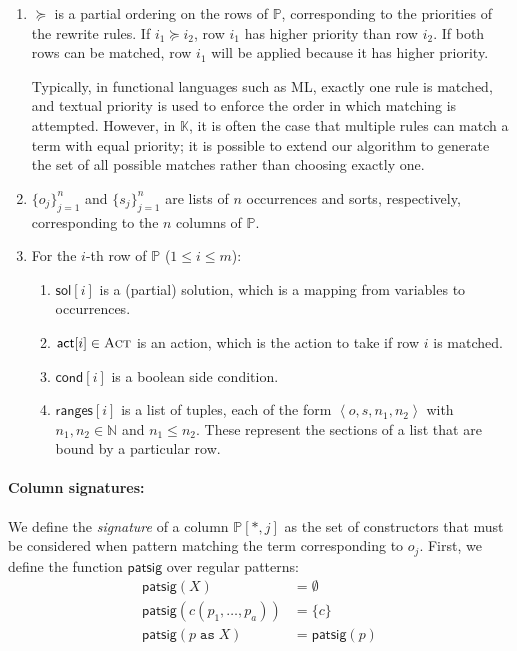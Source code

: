 \documentclass{article}
\theoremstyle{definition}
\newcommand{\K}{$\mathbb{K}$\xspace}
\newcommand{\NN}{\mathbb{N}}
\newcommand{\Act}{\textsc{Act}}
\newcommand{\pr}[1]{\left\langle #1 \right\rangle}
\newcommand{\sol}{\mathsf{sol}}
\newcommand{\actb}{\mathsf{act}}
\newcommand{\condb}{\mathsf{cond}}
\newcommand{\lslen}{\mathsf{ranges}}
\newcommand{\PP}{\mathbb{P}}
\newcommand{\ppcol}[1]{\PP[*,#1]}
\newcommand{\patsig}{\mathsf{patsig}}
\begin{document}
\begin{enumerate}

  \item $\succeq$ is a partial ordering on the rows of $\PP$, corresponding to
    the priorities of the rewrite rules. If $i_1 \succeq i_2$, row $i_1$ has
    higher priority than row $i_2$.  If both rows can be matched, row $i_1$ will
    be applied because it has higher priority. 

    Typically, in functional languages such as ML, exactly one rule is matched,
    and textual priority is used to enforce the order in which matching is
    attempted. However, in \K, it is often the case that multiple rules can
    match a term with equal priority; it is possible to extend our algorithm to
    generate the set of all possible matches rather than choosing exactly one.

  \item $ \{ o_j \}^n_{j=1} $ and $ \{ s_j \}^n_{j=1} $ are lists of $n$
    occurrences and sorts, respectively, corresponding to the $n$ columns of
    $\PP$.

  \item For the $i$-th row of $\PP$ ($1 \le i \le m$):
  \begin{enumerate}
    \item $\sol[i]$ is a (partial) solution, which is a mapping from
      variables to occurrences.

    \item $\actb[i] \in \Act$ is an action, which is the action to take if row
      $i$ is matched.

    \item $\condb[i]$ is a boolean side condition.

    \item $\lslen[i]$ is a list of tuples, each of the form $ \pr{o, s, n_1,
      n_2} $ with $ n_1, n_2 \in \NN $ and $ n_1 \leq n_2 $. These represent the
      sections of a list that are bound by a particular row.
  \end{enumerate}
\end{enumerate}

\paragraph{Column signatures:}

We define the \emph{signature} of a column $ \ppcol{j} $ as the set of
constructors that must be considered when pattern matching the term
corresponding to $ o_j $. First, we define the function $ \patsig $ over
regular patterns:
\begin{align*}
  \patsig(X) & = \emptyset \\
  \patsig(c(p_1, \dots, p_a)) & = \{ c \} \\
  \patsig(p \; \mathtt{as} \; X) & = \patsig(p)
\end{align*}
\end{document}
